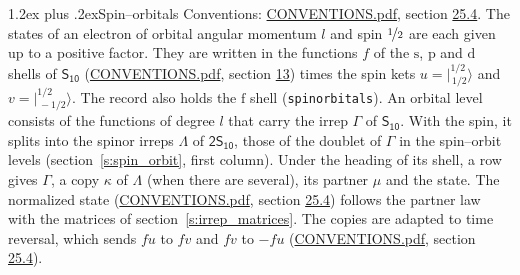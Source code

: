 \documentclass[10pt,a4paper]{article}
\makeatletter
\renewcommand\section{\@startsection{section}{1}{\z@}{-3ex plus -1ex minus -.2ex}%
  {1.2ex plus .2ex}{\normalfont\large\sffamily\bfseries\color{parttitle}}}
\numberwithin{equation}{section}
\newcommand{\grp}[1]{\mathsf{#1}}
\newcommand{\orbital}[1]{\mathrm{#1}}
\newcommand{\mult}{\kappa}
\newcommand{\intx}{\mu}
\newcommand{\jm}[2]{\bigl\lvert{}^{#1}_{\,#2}\bigr\rangle}
\makeatother
\begin{document}
\section{Spin--orbitals}\label{s:spin_orbitals}
Conventions: \href{../../CONVENTIONS.pdf}{CONVENTIONS.pdf}, section \href{../../CONVENTIONS.pdf\#conv.25.4}{25.4}.
\leavevmode\label{n:index.orbital.l}The states of an electron of orbital angular momentum $l$ and spin $\nicefrac{1}{2}$ are each given up to a positive factor. \label{n:local.spinor.uv}\label{n:local.function.f}They are written in the functions $f$ of the $\orbital{s}$, $\orbital{p}$ and $\orbital{d}$ shells of \href{../../../rotation/data/pdf/S10.pdf}{$\grp{S_{10}}$} (\href{../../CONVENTIONS.pdf}{CONVENTIONS.pdf}, section \href{../../../rotation/CONVENTIONS.pdf\#conv.13}{13}) times the spin kets $u = \jm{1/2}{1/2}$ and $v = \jm{1/2}{-1/2}$. The record also holds the $\orbital{f}$ shell (\texttt{spinorbitals}). An orbital level consists of the functions of degree $l$ that carry the irrep $\Gamma$ of \href{../../../rotation/data/pdf/S10.pdf}{$\grp{S_{10}}$}. With the spin, it splits into the spinor irreps $\Lambda$ of $\grp{2S_{10}}$, those of the doublet of $\Gamma$ in the spin--orbit levels (section~\ref{s:spin_orbit}, first column). \label{n:head.state}Under the heading of its shell, a row gives $\Gamma$, a copy $\mult$ of $\Lambda$ (when there are several), its partner $\intx$ and the state. The normalized state (\href{../../CONVENTIONS.pdf}{CONVENTIONS.pdf}, section \href{../../CONVENTIONS.pdf\#conv.25.4}{25.4}) follows the partner law with the matrices of section~\ref{s:irrep_matrices}. The copies are adapted to time reversal, which sends $f u$ to $f v$ and $f v$ to $-f u$ (\href{../../CONVENTIONS.pdf}{CONVENTIONS.pdf}, section \href{../../CONVENTIONS.pdf\#conv.25.4}{25.4}).
\end{document}
